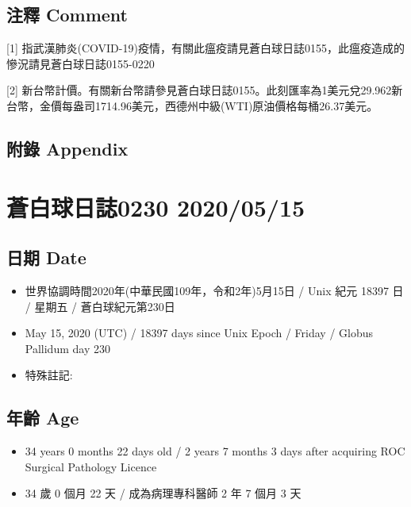 \documentclass[a5paper, 12pt
]{book}
\providecommand{\tightlist}{%
  \setlength{\itemsep}{0pt}\setlength{\parskip}{0pt}}
\begin{document}
\hypertarget{ux6ce8ux91cb-comment-74}{%
\subsection{注釋 Comment}\label{ux6ce8ux91cb-comment-74}}

{[}1{]}
指武漢肺炎(COVID-19)疫情，有關此瘟疫請見蒼白球日誌0155，此瘟疫造成的慘況請見蒼白球日誌0155-0220

{[}2{]}
新台幣計價。有關新台幣請參見蒼白球日誌0155。此刻匯率為1美元兌29.962新台幣，金價每盎司1714.96美元，西德州中級(WTI)原油價格每桶26.37美元。

\hypertarget{ux9644ux9304-appendix-74}{%
\subsection{附錄 Appendix}\label{ux9644ux9304-appendix-74}}

\hypertarget{ux84bcux767dux7403ux65e5ux8a8c0230-20200515}{%
\section{蒼白球日誌0230
2020/05/15}\label{ux84bcux767dux7403ux65e5ux8a8c0230-20200515}}

\hypertarget{ux65e5ux671f-date-75}{%
\subsection{日期 Date}\label{ux65e5ux671f-date-75}}

\begin{itemize}
\tightlist
\item
  世界協調時間2020年(中華民國109年，令和2年)5月15日 / Unix 紀元 18397 日
  / 星期五 / 蒼白球紀元第230日
\item
  May 15, 2020 (UTC) / 18397 days since Unix Epoch / Friday / Globus
  Pallidum day 230
\item
  特殊註記:
\end{itemize}

\hypertarget{ux5e74ux9f61-age-75}{%
\subsection{年齡 Age}\label{ux5e74ux9f61-age-75}}

\begin{itemize}
\tightlist
\item
  34 years 0 months 22 days old / 2 years 7 months 3 days after
  acquiring ROC Surgical Pathology Licence
\item
  34 歲 0 個月 22 天 / 成為病理專科醫師 2 年 7 個月 3 天
\end{itemize}
\end{document}
